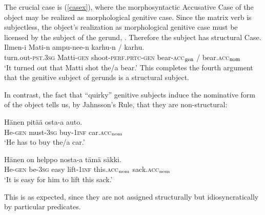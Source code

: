 \documentclass[output=paper,
modfonts
]{LSP/langsci}
\newcommand{\rf}[1]{(\ref{#1})}
\def\trf#1{$_{\textrm{\scriptsize{#1}}}$}
\begin{document}
The crucial case is \rf{casex}, where the morphosyntactic Accusative Case of the object may be
realized as morphological genitive case.  Since the matrix verb is subjectless, the object's
realization as morphological genitive case must be licensed by the subject of the gerund,
.  Therefore the subject has structural Case.
\ea\label{casex}
  \gll  Ilmen-i Mati-n ampu-nee-n karhu-n / karhu. \\
  turn.out-\textsc{pst}.\textsc{3sg}  Matti-\textsc{gen}  shoot-\textsc{perf}.\textsc{prtc}-\textsc{gen} bear-\textsc{acc\trf{gen}} / bear.\textsc{acc\trf{nom}} \\ 
  \glt `It turned out that Matti shot the/a bear.'
\z
This completes the fourth argument that the genitive subject of gerunds is a structural subject.

In contrast, the fact that ``quirky'' genitive subjects induce the nominative form of the
object tells us, by Jahnsson's Rule, that they are non-structural: 
\begin{exe}
\ex\label{shortobj}
	\ea   \gll Hänen pitää osta-a auto. \\ 
He-\textsc{gen} must-\textsc{3sg} buy-\textsc{1inf} car.\textsc{acc\trf{nom}}  \\ 
\glt `He has to buy the/a car.'

	\ex   \gll Hänen on helppo nosta-a tämä säkki. \\ 
He-\textsc{gen} be-\textsc{3sg} easy lift-\textsc{1inf} this.\textsc{acc\trf{nom}} sack.\textsc{acc\trf{nom}}   \\ 
\glt `It is easy for him to lift this sack.'
	\z
\end{exe}
This is as expected, since they are not assigned structurally but idiosyncratically by
particular predicates.
\end{document}
